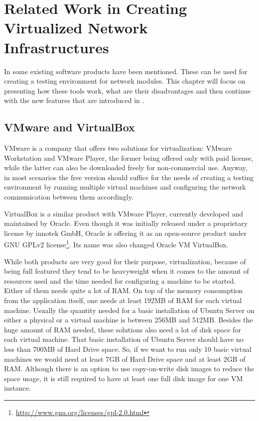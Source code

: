 \chapter{Related Work in Creating Virtualized Network Infrastructures}
\label{chapter:Chapter 2}

In  some existing software products have been mentioned.
These can be used for creating a testing environment for network modules.
This chapter will focus on presenting how these tools work, what are their disadvantages and then continue with the new features that are introduced in \project.

\section{VMware and VirtualBox}
\label{sec:vmw-vbox}

VMware is a company that offers two solutions for virtualization: VMware Workstation and VMware Player, the former being offered only with paid license, while the latter can also be downloaded freely for non-commercial use.
Anyway, in most scenarios the free version should suffice for the needs of creating a testing environment by running multiple virtual machines and configuring the network communication between them accordingly.

VirtualBox is a similar product with VMware Player, currently developed and maintained by Oracle.
Even though it was initially released under a proprietary license by innotek GmbH,  Oracle is offering it as an open-source product under GNU GPLv2 license\footnote{\url{http://www.gnu.org/licenses/gpl-2.0.html}}.
Its name was also changed Oracle VM VirtualBox.

While both products are very good for their purpose, virtualization, because of being full featured they tend to be heavyweight when it comes to the amount of resources used and the time needed for configuring a machine to be started.
Either of them needs quite a lot of RAM. On top of the memory consumption from the application itself, one needs at least 192MB of RAM for each virtual machine.
Usually the quantity needed for a basic installation of Ubuntu Server \cite{ubuntu-sysreq} on either a physical or a virtual machine is between 256MB and 512MB.
Besides the huge amount of RAM needed, these solutions also need a lot of disk space for each virtual machine.
That basic installation of Ubuntu Server should have no less than 700MB of Hard Drive space.
So, if we want to run only 10 basic virtual machines we would need at least 7GB of Hard Drive space and at least 2GB of RAM.
Although there is an option to use copy-on-write disk images to reduce the space usage, it is still required to have at least one full disk image for one VM instance.

